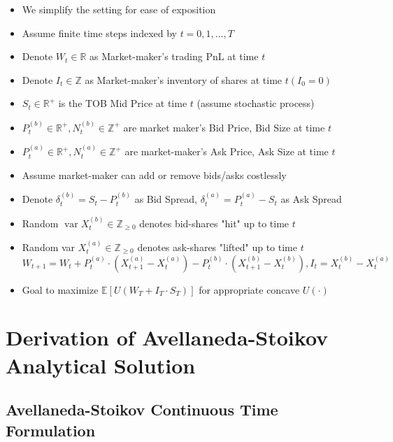 \documentclass[10pt]{article}
\begin{document}
\begin{itemize} 
    \item We simplify the setting for ease of exposition
    \item Assume finite time steps indexed by $t=0,1, \ldots, T$
    \item Denote $W_{t} \in \mathbb{R}$ as Market-maker's trading $\mathrm{PnL}$ at time $t$
    \item Denote $I_{t} \in \mathbb{Z}$ as Market-maker's inventory of shares at time $t\left(I_{0}=0\right)$
    \item $S_{t} \in \mathbb{R}^{+}$ is the TOB Mid Price at time $t$ (assume stochastic process)
    \item $P_{t}^{(b)} \in \mathbb{R}^{+}, N_{t}^{(b)} \in \mathbb{Z}^{+}$ are market maker's Bid Price, Bid Size at time $t$
    \item $P_{t}^{(a)} \in \mathbb{R}^{+}, N_{t}^{(a)} \in \mathbb{Z}^{+}$ are market-maker's Ask Price, Ask Size at time $t$
    \item Assume market-maker can add or remove bids/asks costlessly
    \item Denote $\delta_{t}^{(b)}=S_{t}-P_{t}^{(b)}$ as Bid Spread, $\delta_{t}^{(a)}=P_{t}^{(a)}-S_{t}$ as Ask Spread
    \item Random $\operatorname{var} X_{t}^{(b)} \in \mathbb{Z}_{\geq 0}$ denotes bid-shares "hit" up to time $t$
    \item Random var $X_{t}^{(a)} \in \mathbb{Z}_{\geq 0}$ denotes ask-shares "lifted" up to time $t$ $W_{t+1}=W_{t}+P_{t}^{(a)} \cdot\left(X_{t+1}^{(a)}-X_{t}^{(a)}\right)-P_{t}^{(b)} \cdot\left(X_{t+1}^{(b)}-X_{t}^{(b)}\right), I_{t}=X_{t}^{(b)}-X_{t}^{(a)}$
    \item Goal to maximize $\mathbb{E}\left[U\left(W_{T}+I_{T} \cdot S_{T}\right)\right]$ for appropriate concave $U(\cdot)$
\end{itemize}

\section{Derivation of Avellaneda-Stoikov Analytical Solution}

\subsection{Avellaneda-Stoikov Continuous Time Formulation}
\end{document}
